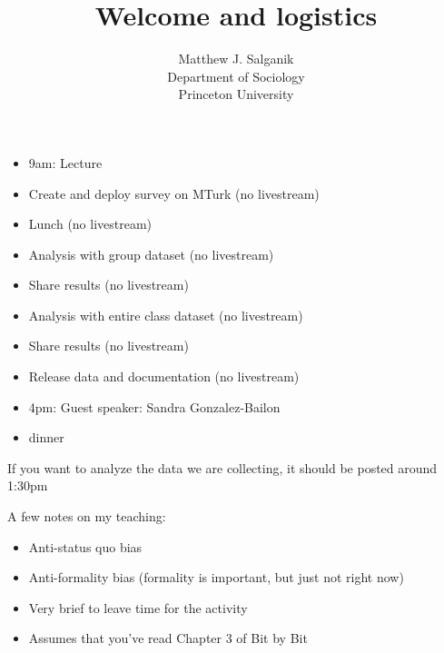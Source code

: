 \documentclass[aspectratio=169]{beamer}
\title[]{Welcome and logistics}
\author[]{Matthew J. Salganik\\Department of Sociology\\Princeton University}
\date[]{Summer Institute in Computational Social Science\\June 22, 2017
\vfill
\begin{flushright}
\vspace{0.6in}
\texttt{[image: figures/cc-by.png]}
\end{flushright}
}
\begin{document}
\frame{\titlepage}
\begin{frame}

\begin{itemize}
\item 9am: Lecture 
\item Create and deploy survey on MTurk (no livestream)
\item Lunch (no livestream)
\item Analysis with group dataset (no livestream)
\item Share results (no livestream)
\item Analysis with entire class dataset (no livestream)
\item Share results (no livestream)
\item Release data and documentation (no livestream)
\item 4pm: Guest speaker: Sandra Gonzalez-Bailon
\item dinner
\end{itemize}

\vfill
If you want to analyze the data we are collecting, it should be posted around 1:30pm

\end{frame}
\begin{frame}

A few notes on my teaching:
\begin{itemize}
\item Anti-status quo bias
\pause
\item Anti-formality bias (formality is important, but just not right now)
\pause
\item Very brief to leave time for the activity
\pause
\item Assumes that you've read Chapter 3 of Bit by Bit
\end{itemize}

\end{frame}
\end{document}
